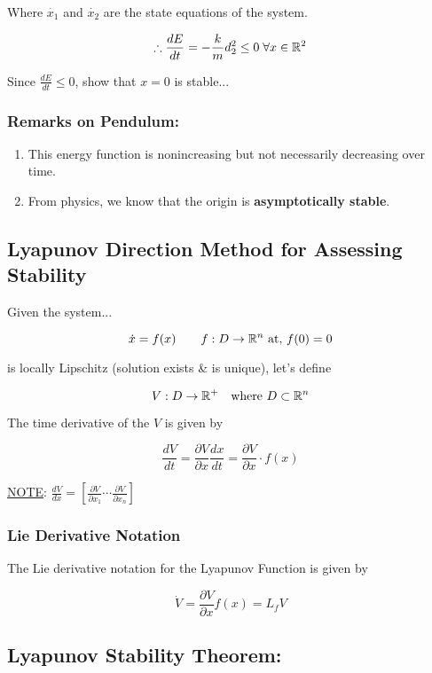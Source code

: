 \noindent Where $\dot{x_1}$ and $\dot{x_2}$ are the state equations of the system.

$$
\therefore \frac{dE}{dt} = - \frac{k}{m}d_2^2 \leq 0 \; \forall x \in \mathbb{R}^2
$$

\noindent Since $\frac{dE}{dt} \leq 0$, show that $x =0 $ is stable...

\subsubsection*{Remarks on Pendulum:}

\begin{enumerate}
  \item This energy function is nonincreasing but not necessarily decreasing over time.
  \item From physics, we know that the origin is \textbf{asymptotically stable}.
\end{enumerate}

\subsection*{Lyapunov Direction Method for Assessing Stability}

Given the system...

$$
\dot{x} = f(x) \quad \quad f:D \rightarrow \mathbb{R}^n \text{ at, } f(0) = 0
$$

\noindent is locally Lipschitz (solution exists \& is unique), let's define

$$
V:D \rightarrow \mathbb{R}^{+} \quad \text{where } D \subset \mathbb{R}^n
$$

\noindent The time derivative of the $V$ is given by

$$
\frac{dV}{dt} = \frac{\partial V}{\partial x} \frac{d x}{dt} = \frac{\partial V}{\partial x} \cdot f(x)$$

\noindent \underline{NOTE}: $\frac{dV}{dx} = \left[ \frac{\partial V}{\partial x_1} \cdots \frac{\partial V}{\partial x_n} \right]$

\subsubsection*{Lie Derivative Notation}

The Lie derivative notation for the Lyapunov Function is given by

$$
\dot{V} = \frac{\partial V}{\partial x} f(x) = L_f V
$$


\subsection*{Lyapunov Stability Theorem:}

